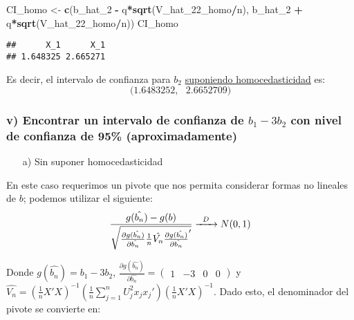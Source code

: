 \documentclass[
]{article}
\newenvironment{Shaded}{\begin{snugshade}}{\end{snugshade}}
\newcommand{\FunctionTok}[1]{\textcolor[rgb]{0.13,0.29,0.53}{\textbf{#1}}}
\newcommand{\NormalTok}[1]{#1}
\newcommand{\OtherTok}[1]{\textcolor[rgb]{0.56,0.35,0.01}{#1}}
\newcommand{\SpecialCharTok}[1]{\textcolor[rgb]{0.81,0.36,0.00}{\textbf{#1}}}
\begin{document}
\begin{Shaded}
\begin{Highlighting}[]
\NormalTok{CI\_homo }\OtherTok{\textless{}{-}} \FunctionTok{c}\NormalTok{(b\_hat\_2 }\SpecialCharTok{{-}}\NormalTok{ q}\SpecialCharTok{*}\FunctionTok{sqrt}\NormalTok{(V\_hat\_22\_homo}\SpecialCharTok{/}\NormalTok{n),}
\NormalTok{             b\_hat\_2 }\SpecialCharTok{+}\NormalTok{ q}\SpecialCharTok{*}\FunctionTok{sqrt}\NormalTok{(V\_hat\_22\_homo}\SpecialCharTok{/}\NormalTok{n))}
\NormalTok{CI\_homo}
\end{Highlighting}
\end{Shaded}

\begin{verbatim}
##      X_1      X_1 
## 1.648325 2.665271
\end{verbatim}

Es decir, el intervalo de confianza para \(b_2\)
\underline{suponiendo homocedasticidad} es: \[
\Big(1.6483252 , \ \ \ 2.6652709\Big)
\]

\subsubsection{\texorpdfstring{v) Encontrar un intervalo de confianza de
\(b_1 - 3b_2\) con nivel de confianza de 95\%
(aproximadamente)}{v) Encontrar un intervalo de confianza de b\_1 - 3b\_2 con nivel de confianza de 95\% (aproximadamente)}}\label{v-encontrar-un-intervalo-de-confianza-de-b_1---3b_2-con-nivel-de-confianza-de-95-aproximadamente}

\begin{itemize}
  \item[a)] Sin suponer homocedasticidad
\end{itemize}

En este caso requerimos un pivote que nos permita considerar formas no
lineales de \(b\); podemos utilizar el siguiente: \[
\dfrac{g(\hat{b_n}) - g(b)}{\sqrt{\frac{\partial{g(\hat{b_n})}}{\partial{\hat{b_n}}}\frac{1}{n}\hat{V_n}\frac{\partial{g(\hat{b_n})}}{\partial{\hat{b_n}}}'}} \xrightarrow{\enskip D\enskip} N(0,1)
\]

Donde \(g(\hat{b_n}) = b_1 - 3b_2\),
\(\frac{\partial{g(\hat{b_n})}}{\partial{\hat{b_n}}} = \begin{pmatrix} 1 & -3 & 0 & 0\end{pmatrix}\)
y
\(\hat{V_n} = (\frac{1}{n}X'X)^{-1} (\frac{1}{n}\sum_{j=1}^{n} U_j^2x_jx_j') (\frac{1}{n}X'X)^{-1}\).
Dado esto, el denominador del pivote se convierte en:
\end{document}

